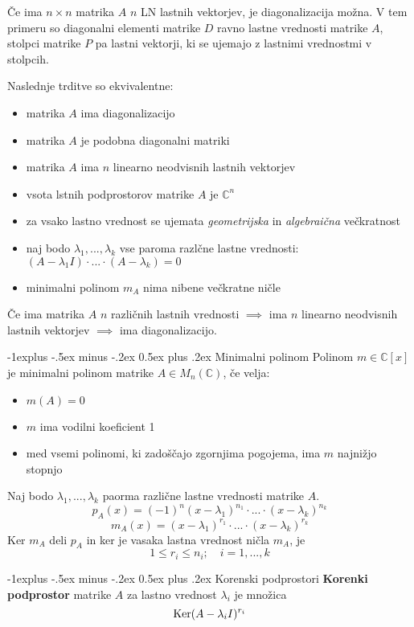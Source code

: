 \documentclass[a4paper,landscape]{article}
\makeatletter
\renewcommand{\subsection}{\@startsection{subsection}{2}{0mm}%
                                {-1explus -.5ex minus -.2ex}%
                                {0.5ex plus .2ex}%
                                {\normalfont\normalsize\bfseries}}
\makeatother
\begin{document}
\begin{multicols}{3}
Če ima $n \times n$ matrika $A$ $n$ LN lastnih vektorjev, je diagonalizacija možna. V tem primeru so diagonalni elementi matrike $D$ ravno lastne vrednosti matrike $A$, stolpci matrike $P$ pa lastni vektorji, ki se ujemajo z lastnimi vrednostmi v stolpcih.

Naslednje trditve so ekvivalentne:
\begin{itemize}
    \item matrika $A$ ima diagonalizacijo
    \item matrika $A$ je podobna diagonalni matriki
    \item matrika $A$ ima $n$ linearno neodvisnih lastnih vektorjev
    \item vsota lstnih podprostorov matrike $A$ je $\mathbb{C}^n$
    \item za vsako lastno vrednost se ujemata \emph{geometrijska} in \emph{algebraična} večkratnost
    \item naj bodo $\lambda_1,..., \lambda_k$ vse paroma razlčne lastne vrednosti: $(A-\lambda_1 I)\cdot ... \cdot (A-\lambda_k) = 0$
    \item minimalni polinom $m_A$ nima nibene večkratne ničle
\end{itemize}

Če ima matrika $A$ $n$ različnih lastnih vrednosti $\implies$ ima $n$ linearno neodvisnih lastnih vektorjev $\implies$ ima diagonalizacijo.

\subsection{Minimalni polinom}
Polinom $m \in \mathbb{C}[x]$ je minimalni polinom matrike $A \in M_n(\mathbb{C})$, če velja:
\begin{itemize}
    \item $m(A) = 0$
    \item $m$ ima vodilni koeficient 1
    \item med vsemi polinomi, ki zadoščajo zgornjima pogojema, ima $m$ najnižjo stopnjo
\end{itemize}

Naj bodo $\lambda_1, ..., \lambda_k$ paorma različne lastne vrednosti matrike $A$.
\[p_A(x)=(-1)^n(x-\lambda_1)^{n_1} \cdot ... \cdot (x-\lambda_k)^{n_k} \]
\[m_A(x)=(x-\lambda_1)^{r_1} \cdot ... \cdot (x-\lambda_k)^{r_k} \]
Ker $m_A$ deli $p_A$ in ker je vasaka lastna vrednost ničla $m_A$, je
\[1 \leq r_i \leq n_i ;\quad i = 1, ..., k\]

\subsection{Korenski podprostori}
\textbf{Korenki podprostor} matrike $A$ za lastno vrednost $\lambda_i$ je množica 
\[ \textmd{Ker}(A-\lambda_i I)^{r_i} \]


\end{multicols}
\end{document}
